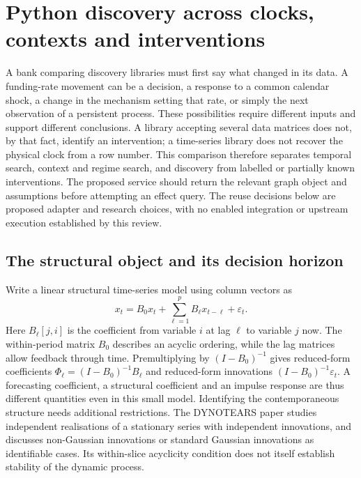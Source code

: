 \section{Python discovery across clocks, contexts and interventions}
\label{exec14:python-temporal}

A bank comparing discovery libraries must first say what changed in its data.
A funding-rate movement can be a decision, a response to a common calendar
shock, a change in the mechanism setting that rate, or simply the next
observation of a persistent process. These possibilities require different
inputs and support different conclusions. A library accepting several data
matrices does not, by that fact, identify an intervention; a time-series
library does not recover the physical clock from a row number. This comparison
therefore separates temporal search, context and regime search, and discovery
from labelled or partially known interventions. The proposed service should
return the relevant graph object and assumptions before attempting an effect
query. The reuse decisions below are proposed adapter and research choices,
with no enabled integration or upstream execution established by this review.
\citep{exec14_pt_contract}

\subsection{The structural object and its decision horizon}

Write a linear structural time-series model using column vectors as
\[
 x_t=B_0x_t+\sum_{\ell=1}^{p}B_\ell x_{t-\ell}+\varepsilon_t.
\]
Here $B_\ell[j,i]$ is the coefficient from variable $i$ at lag $\ell$ to
variable $j$ now. The within-period matrix $B_0$ describes an acyclic ordering,
while the lag matrices allow feedback through time. Premultiplying by
$(I-B_0)^{-1}$ gives reduced-form coefficients
$\Phi_\ell=(I-B_0)^{-1}B_\ell$ and reduced-form innovations
$(I-B_0)^{-1}\varepsilon_t$. A forecasting coefficient, a structural
coefficient and an impulse response are thus different quantities even in
this small model. Identifying the contemporaneous structure needs additional
restrictions. The DYNOTEARS paper studies independent realisations of a
stationary series with independent innovations, and discusses non-Gaussian
innovations or standard Gaussian innovations as identifiable cases. Its
within-slice acyclicity condition does not itself establish stability of the
dynamic process. \citep{exec14_pt_paper_dynotears}

